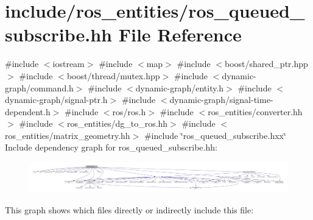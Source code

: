 \hypertarget{ros__queued__subscribe_8hh}{}\section{include/ros\+\_\+entities/ros\+\_\+queued\+\_\+subscribe.hh File Reference}
\label{ros__queued__subscribe_8hh}
{\ttfamily \#include $<$iostream$>$}\newline
{\ttfamily \#include $<$map$>$}\newline
{\ttfamily \#include $<$boost/shared\+\_\+ptr.\+hpp$>$}\newline
{\ttfamily \#include $<$boost/thread/mutex.\+hpp$>$}\newline
{\ttfamily \#include $<$dynamic-\/graph/command.\+h$>$}\newline
{\ttfamily \#include $<$dynamic-\/graph/entity.\+h$>$}\newline
{\ttfamily \#include $<$dynamic-\/graph/signal-\/ptr.\+h$>$}\newline
{\ttfamily \#include $<$dynamic-\/graph/signal-\/time-\/dependent.\+h$>$}\newline
{\ttfamily \#include $<$ros/ros.\+h$>$}\newline
{\ttfamily \#include $<$ros\+\_\+entities/converter.\+hh$>$}\newline
{\ttfamily \#include $<$ros\+\_\+entities/dg\+\_\+to\+\_\+ros.\+hh$>$}\newline
{\ttfamily \#include $<$ros\+\_\+entities/matrix\+\_\+geometry.\+hh$>$}\newline
{\ttfamily \#include \char`\"{}ros\+\_\+queued\+\_\+subscribe.\+hxx\char`\"{}}\newline
Include dependency graph for ros\+\_\+queued\+\_\+subscribe.\+hh\+:
\nopagebreak
\begin{figure}[H]
\begin{center}
\leavevmode
\includegraphics[width=350pt]{ros__queued__subscribe_8hh__incl}
\end{center}
\end{figure}
This graph shows which files directly or indirectly include this file\+:
\nopagebreak

